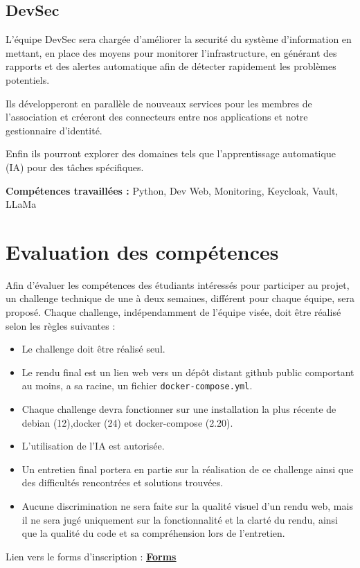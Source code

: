 \documentclass[12pt]{article}
\begin{document}
	
	\subsection{DevSec}
	L'équipe DevSec sera chargée d'améliorer la securité du système d'information en mettant, en place des moyens pour monitorer l'infrastructure, en générant des rapports et des alertes automatique afin de détecter rapidement les problèmes potentiels.
	\bigskip
	
	\noindent Ils développeront en parallèle de nouveaux services pour les membres de l'association et créeront des connecteurs entre nos applications et notre gestionnaire d'identité. 
	\bigskip
	
	\noindent Enfin ils pourront explorer des domaines tels que l'apprentissage automatique (IA) pour des tâches spécifiques.
	\bigskip
	
	\noindent \textbf{Compétences travaillées :} Python, Dev Web, Monitoring, Keycloak, Vault, LLaMa
	
	\section{Evaluation des compétences}
	
	Afin d'évaluer les compétences des étudiants intéressés pour participer au projet, un challenge technique de une à deux semaines, différent pour chaque équipe, sera proposé.
	Chaque challenge, indépendamment de  l'équipe visée, doit être réalisé selon les règles suivantes :
	\begin{itemize}
		\item Le challenge doit être réalisé seul.
		\item Le rendu final est un lien web vers un dépôt distant github public comportant au moins, a sa racine, un fichier \texttt{docker-compose.yml}.
		\item Chaque challenge devra fonctionner sur une installation la plus récente de debian (12),docker (24) et docker-compose (2.20).
		\item L'utilisation de l'IA est autorisée.
		\item Un entretien final portera en partie sur la réalisation de ce challenge ainsi que des difficultés rencontrées et solutions trouvées.
		\item Aucune discrimination ne sera faite sur la qualité visuel d'un rendu web, mais il ne sera jugé uniquement sur la fonctionnalité et la clarté du rendu, ainsi que la qualité du code et sa compréhension lors de l'entretien.
	\end{itemize}

	\noindent  Lien vers le forms d'inscription : \underline{\href{https://forms.office.com/e/jD5f8pX5PH}{\textbf{Forms}}}
	
		
	
	
\end{document}
